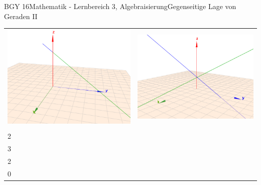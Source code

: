 \documentclass[oneside,openany,headings=optiontotoc,11pt,numbers=noenddot]{scrreprt}
\begin{document}
	\begin{worksheet}{BGY 16}{Mathematik - Lernbereich 3, Algebraisierung}{Gegenseitige Lage von Geraden II}
				
		\begin{framed}
			\noindent
			\begin{center}
				\begin{tabularx}{\textwidth}{X|X}
					\includegraphics[scale=0.55]{Bilder/ghGleich3D.png} & \includegraphics[scale=0.55]{Bilder/ghSchnitt3D.png}\\
					\(g_1: \vec{x} = \left(\begin{array}{c}1\\2\\3\end{array}\right) + r\left(\begin{array}{c}4\\2\\0\end{array}\right)\) & 

\end{tabularx}
\end{center}
\end{framed}
\end{worksheet}
\end{document}
